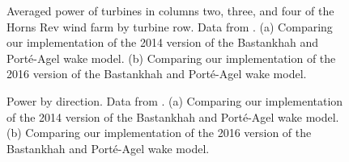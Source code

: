 \documentclass[conf]{new-aiaa}
\begin{document}
{\begin{figure}[ht]
	\centering
	\caption{Averaged power of turbines in columns two, three, and four of the Horns Rev wind farm by turbine row. Data from \cite{niayifar2016}. (a) Comparing our implementation of the 2014 version of the Bastankhah and Port\'{e}-Agel wake model. (b) Comparing our implementation of the 2016 version of the Bastankhah and Port\'{e}-Agel wake model.}
	\label{fig:power_line}
\end{figure}

\begin{figure}[ht]
	\centering
	\caption{Power by direction. Data from \cite{niayifar2016}. (a) Comparing our implementation of the 2014 version of the Bastankhah and Port\'{e}-Agel wake model. (b) Comparing our implementation of the 2016 version of the Bastankhah and Port\'{e}-Agel wake model.}
	

\end{figure}}
\end{document}
